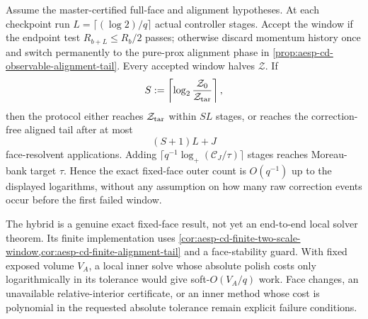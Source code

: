 \begin{corollary}
\label{cor:aesp-cd-fixed-face-gate-align}
Assume the master-certified full-face and alignment hypotheses.  At each
checkpoint run $L=\lceil(\log2)/q\rceil$ actual controller stages.  Accept the
window if the endpoint test
$R_{b+L}\leq R_b/2$ passes; otherwise discard momentum history once and switch
permanently to the pure-prox alignment phase in
\cref{prop:aesp-cd-observable-alignment-tail}.  Every accepted window halves
$\mathcal Z$.  If
\begin{equation*}
 S:=\left\lceil\log_2\frac{\mathcal Z_0}{\mathcal Z_{\rm tar}}\right\rceil,
\end{equation*}
then the protocol either reaches $\mathcal Z_{\rm tar}$ within $SL$ stages,
or reaches the correction-free aligned tail after at most
\begin{equation}
 (S+1)L+J
 \label{eq:aesp-cd-fixed-face-gate-align-count}
\end{equation}
face-resolvent applications.  Adding
$\lceil q^{-1}\log_+(\mathcal C_J/\tau)\rceil$ stages reaches Moreau-bank target
$\tau$.  Hence the exact fixed-face outer count is $O(q^{-1})$ up to the
displayed logarithms, without any assumption on how many raw correction
events occur before the first failed window.
\end{corollary}

The hybrid is a genuine exact fixed-face result, not yet an end-to-end local
solver theorem.  Its finite implementation uses
\cref{cor:aesp-cd-finite-two-scale-window,cor:aesp-cd-finite-alignment-tail}
and a face-stability guard.  With fixed exposed volume $V_A$, a local inner
solve whose absolute polish costs only logarithmically in its tolerance would
give soft-$O(V_A/q)$ work.  Face changes, an unavailable relative-interior
certificate, or an inner method whose cost is polynomial in the requested
absolute tolerance remain explicit failure conditions.

